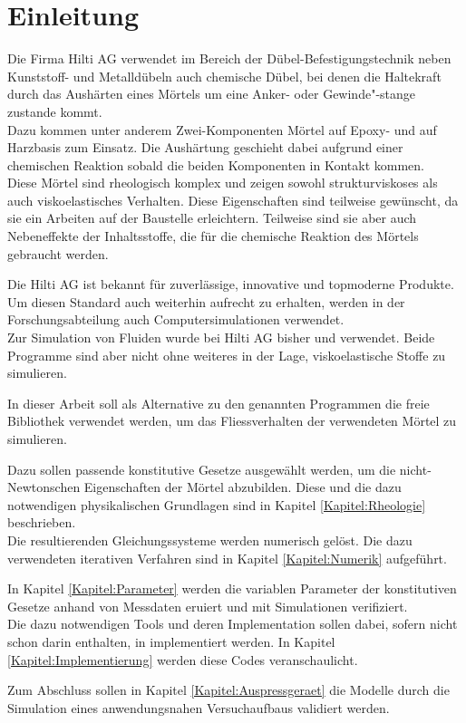 \section{Einleitung}
\label{Kapitel:Einleitung}
Die Firma Hilti AG verwendet im Bereich der Dübel-Befestigungstechnik neben Kunststoff- und Metalldübeln auch chemische Dübel, bei denen die Haltekraft durch das Aushärten eines Mörtels um eine Anker- oder Gewinde"-stange zustande kommt. \\
Dazu kommen unter anderem Zwei-Komponenten Mörtel auf Epoxy- und auf Harzbasis zum Einsatz. Die Aushärtung geschieht dabei aufgrund einer chemischen Reaktion sobald die beiden Komponenten in Kontakt kommen.\\
Diese Mörtel sind rheologisch komplex und zeigen sowohl strukturviskoses als auch viskoelastisches Verhalten. Diese Eigenschaften sind teilweise gewünscht, da sie ein Arbeiten auf der Baustelle erleichtern. Teilweise sind sie aber auch Nebeneffekte der Inhaltsstoffe, die für die chemische Reaktion des Mörtels gebraucht werden.

Die Hilti AG ist bekannt für zuverlässige, innovative und topmoderne Produkte. Um diesen Standard auch weiterhin aufrecht zu erhalten, werden in der Forschungsabteilung auch Computersimulationen verwendet.\\
Zur Simulation von Fluiden wurde bei Hilti AG bisher \comsol{} und \cfx{} verwendet. Beide Programme sind aber nicht ohne weiteres in der Lage, viskoelastische Stoffe zu simulieren.%

In dieser Arbeit soll als Alternative zu den genannten Programmen die freie Bibliothek \openfoam{} verwendet werden, um das Fliessverhalten der verwendeten Mörtel zu simulieren.

Dazu sollen passende konstitutive Gesetze ausgewählt werden, um die nicht-Newtonschen Eigenschaften der Mörtel abzubilden. Diese und die dazu notwendigen physikalischen Grundlagen sind in Kapitel \ref{Kapitel:Rheologie} beschrieben.\\
Die resultierenden Gleichungssysteme werden numerisch gelöst. Die dazu verwendeten iterativen Verfahren sind in Kapitel \ref{Kapitel:Numerik} aufgeführt.

In Kapitel \ref{Kapitel:Parameter} werden die variablen Parameter der konstitutiven Gesetze anhand von Messdaten eruiert und mit Simulationen verifiziert.\\
Die dazu notwendigen Tools und deren Implementation sollen dabei, sofern nicht schon darin enthalten, in \openfoam{} implementiert werden. In Kapitel \ref{Kapitel:Implementierung} werden diese Codes veranschaulicht.

Zum Abschluss sollen in Kapitel \ref{Kapitel:Auspressgeraet} die Modelle durch die Simulation eines anwendungsnahen Versuchaufbaus validiert werden.
